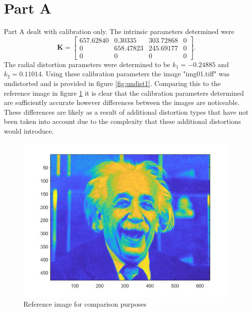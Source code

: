 \documentclass[12pt,oneside,openany,a4paper, %
english, %
masters-t, goldenblock]{usthesis}
\begin{document}
\section{Part A}
Part A dealt with calibration only. The intrinsic parameters determined were
\begin{equation}
  \bm{K} = \begin{bmatrix}
  657.62840 & 0.30335 & 303.72868 & 0\\
  0 & 658.47823 & 245.69177 & 0\\
  0 & 0 & 0 & 0
  \end{bmatrix}.
\end{equation}
The radial distortion parameters were determined to be $k_1 = -0.24885$ and $k_2 = 0.11014$. Using these calibration parameters the image "img01.tiff" was undistorted and is provided in figure \ref{fig:undist1}. Comparing this to the reference image in figure \ref{fig:reference1} it is clear that the calibration parameters determined are sufficiently accurate however differences between the images are noticeable. These differences are likely as a result of additional distortion types that have not been taken into account due to the complexity that these additional distortions would introduce.

\begin{figure}[H]
    \centering
    \includegraphics[scale=0.6]{reference_image.jpg}
    \caption{Reference image for comparison purposes}
    \label{fig:reference1}
\end{figure}
\end{document}
